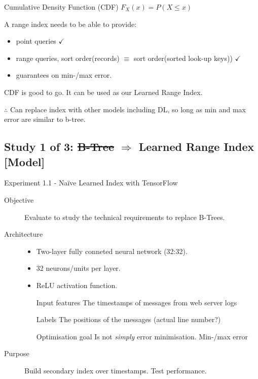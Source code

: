 \documentclass[presentation]{beamer}
\begin{document}
\begin{frame}[label={sec:org5adb484}]{Cumulative Density Function (CDF)}
\(F_X(x) = P(X \leq x)\)

A range index needs to be able to provide:
\begin{itemize}
\item point queries \(\checkmark\)
\item range queries, sort order(records) \(\equiv\) sort order(sorted look-up keys)) \(\checkmark\)
\item guarantees on min-/max error.
\end{itemize}

CDF is good to go. It can be used as our Learned Range Index.
\end{frame}
\begin{frame}[label={sec:org956438f}]{\(\therefore\)}
Can replace index with other models including DL, so long as min and max error are similar to b-tree.
\end{frame}


\subsection{Study 1 of 3: \sout{B-Tree} \(\Rightarrow\) Learned Range Index [Model]}
\label{sec:orgd733eac}
\begin{frame}[label={sec:org34049c4}]{Experiment 1.1 - Naïve Learned Index with TensorFlow}
\begin{description}
\item[{Objective}] Evaluate to study the technical requirements to replace B-Trees.
\item[{Architecture}] \begin{itemize}
\item Two-layer fully conneted neural network (32:32).
\item 32 neurons/units per layer.
\item ReLU activation function.
\item[{Input features}] The timestamps of messages from web server logs
\item[{Labels}] The positions of the messages (actual line number?)
\item[{Optimisation goal}] Is not \emph{simply} error minimisation. Min-/max error
\end{itemize}
\item[{Purpose}] Build secondary index over timestamps. Test performance.
\end{description}
\end{frame}
\end{document}

